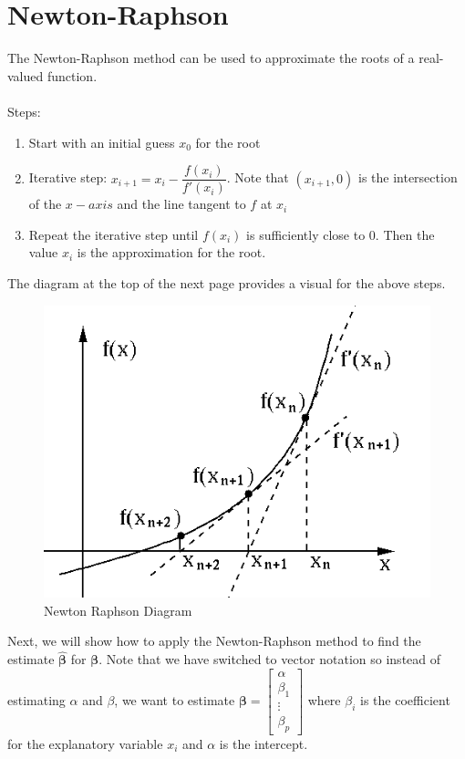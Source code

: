 \documentclass[12pt,timesnewroman,letterpaper]{article}
\begin{document}
\section{Newton-Raphson}

The Newton-Raphson method can be used to approximate the roots of a real-valued function. \\\\
Steps:
\begin{enumerate}
    \item Start with an initial guess $x_0$ for the root
    \item Iterative step: $x_{i+1} = x_i - \dfrac{f(x_i)}{f'(x_i)}$. Note that $(x_{i+1}, 0)$ is the intersection of the $x-axis$ and the line tangent to $f$ at $x_i$
    \item Repeat the iterative step until $f(x_i)$ is sufficiently close to $0$. Then the value $x_i$ is the approximation for the root.
\end{enumerate}

\noindent The diagram at the top of the next page provides a visual for the above steps.\\

\begin{figure}[hbtp]
        \centering
        \includegraphics[width=4.5in]{NewtonRaphson.png}
        \caption{Newton Raphson Diagram}
        \label{Newton Raphson}
    \end{figure}

\noindent Next, we will show how to apply the Newton-Raphson method to find the estimate  $\boldsymbol{\hat{\beta}}$ for $\boldsymbol{\beta}$. Note that we have switched to vector notation so instead of estimating $\alpha$ and $\beta$, we want to estimate $\boldsymbol{\beta} = 
\begin{bmatrix} 
    \alpha \\
    \beta_1 \\
    \vdots \\
    \beta_p
\end{bmatrix}$ where $\beta_i$ is the coefficient for the explanatory variable $x_i$ and $\alpha$ is the intercept. \\
\end{document}
